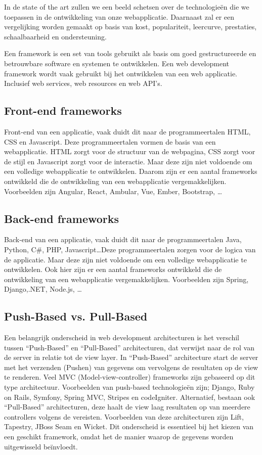 In de state of the art zullen we een beeld schetsen over de technologieën die
we toepassen in de ontwikkeling van onze webapplicatie. Daarnaast zal er een
vergelijking worden gemaakt op basis van kost, populariteit, leercurve,
prestaties, schaalbaarheid en ondersteuning.

Een framework is een set van tools gebruikt als basis om goed gestructureerde
en betrouwbare software en systemen te ontwikkelen. Een web development
framework wordt vaak gebruikt bij het ontwikkelen van een web applicatie.
Inclusief web services, web resources en web API's.

\subsection{Front-end frameworks}%
Front-end van een applicatie, vaak duidt dit naar de programmeertalen HTML, CSS
en Ja\-va\-script. Deze programmeertalen vormen de basis van een webapplicatie.
HTML zorgt voor de structuur van de webpagina, CSS zorgt voor de stijl en
Ja\-va\-script zorgt voor de interactie. Maar deze zijn niet voldoende om een
volledige webapplicatie te ontwikkelen. Daarom zijn er een aantal frameworks
ontwikkeld die de ontwikkeling van een webapplicatie vergemakkelijken.
Voorbeelden zijn Angular, React, Ambular, Vue, Ember, Bootstrap,
\ldots\autocite{Jaiswal2022}

\subsection{Back-end frameworks}%
Back-end van een applicatie, vaak duidt dit naar de programmeertalen Java,
Python, C\#, PHP, Ja\-va\-script\ldots Deze programmeertalen zorgen voor de
logica van de applicatie. Maar deze zijn niet voldoende om een volledige
webapplicatie te ontwikkelen. Ook hier zijn er een aantal frameworks ontwikkeld
die de ontwikkeling van een webapplicatie vergemakkelijken. Voorbeelden zijn
Spring, Django,.NET, Node.js, \ldots\autocite{Kaluza2019}

\subsection{Push-Based vs. Pull-Based}%
Een belangrijk onderscheid in web development architecturen is het verschil
tussen ``Push-Based'' en ``Pull-Based'' architecturen, dat verwijst naar de rol
van de server in relatie tot de view layer.\autocite{Lomas2022} \bigbreak In
``Push-Based'' architecture start de server met het verzenden (Pushen) van
gegevens om vervolgens de resultaten op de view te renderen. Veel MVC
(Model-view-controller) frameworks zijn gebaseerd op dit type architectuur.
Voorbeelden van push-based technologieën zijn; Django, Ruby on Rails, Symfony,
Spring MVC, Stripes en codeIgniter. \bigbreak Alternatief, bestaan ook
``Pull-Based'' architecturen, deze haalt de view laag resultaten op van
meerdere controllers volgens de vereisten. Voorbeelden van deze architecturen
zijn Lift, Tapestry, JBoss Seam en Wicket. \bigbreak Dit onderscheid is
essentieel bij het kiezen van een geschikt framework, omdat het de manier
waarop de gegevens worden uitgewisseld beïnvloedt.

